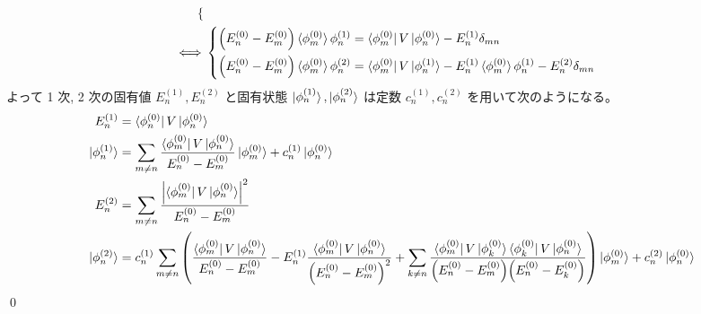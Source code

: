 \documentclass[uplatex,dvipdfmx,a4paper,11pt]{jlreq}
\makeatletter
\theoremstyle{definition}
\renewenvironment{proof}[1][\proofname]{\par
  \normalfont
  \topsep6\p@\@plus6\p@ \trivlist
  \item[\hskip\labelsep{\bfseries #1}\@addpunct{\bfseries}]\ignorespaces\quad\par
}{%
  \qed\endtrivlist\@endpefalse
}
\renewcommand\proofname{証明}
\makeatother
\begin{document}
\begin{proof}
\begin{align}
\begin{dcases}
           \end{dcases}          \\
    \iff & \begin{dcases}
             \qty(E_n^{(0)} - E_m^{(0)})\braket{\phi_m^{(0)}}{\phi_n^{(1)}} = \bra{\phi_m^{(0)}}V\ket{\phi_n^{(0)}} - E_n^{(1)}\delta_{mn} \\
             \qty(E_n^{(0)} - E_m^{(0)})\braket{\phi_m^{(0)}}{\phi_n^{(2)}} = \bra{\phi_m^{(0)}}V\ket{\phi_n^{(1)}} - E_n^{(1)}\braket{\phi_m^{(0)}}{\phi_n^{(1)}} - E_n^{(2)}\delta_{mn}
           \end{dcases}
  \end{align}
  よって 1 次, 2 次の固有値 $E_n^{(1)}, E_n^{(2)}$ と固有状態 $\ket{\phi_n^{(1)}}, \ket{\phi_n^{(2)}}$ は定数 $c_n^{(1)}, c_n^{(2)}$ を用いて次のようになる。
  \begin{align}
    E_n^{(1)}          & = \bra{\phi_n^{(0)}}V\ket{\phi_n^{(0)}}                                                                                                                                                                                                                                                                                                                                                             \\
    \ket{\phi_n^{(1)}} & = \sum_{m\neq n}\frac{\bra{\phi_m^{(0)}}V\ket{\phi_n^{(0)}}}{E_n^{(0)} - E_m^{(0)}}\ket{\phi_m^{(0)}} + c_n^{(1)}\ket{\phi_n^{(0)}}                                                                                                                                                                                                                                                                 \\
    E_n^{(2)}          & = \sum_{m\neq n}\frac{\qty|\bra{\phi_m^{(0)}}V\ket{\phi_n^{(0)}}|^2}{E_n^{(0)} - E_m^{(0)}}                                                                                                                                                                                                                                                                                                         \\
    \ket{\phi_n^{(2)}} & = c_n^{(1)}\sum_{m\neq n}\qty(\frac{\bra{\phi_m^{(0)}}V\ket{\phi_n^{(0)}}}{E_n^{(0)} - E_m^{(0)}} - E_n^{(1)}\frac{\bra{\phi_m^{(0)}}V\ket{\phi_n^{(0)}}}{\qty(E_n^{(0)} - E_m^{(0)})^2} + \sum_{k\neq n}\frac{\bra{\phi_m^{(0)}}V\ket{\phi_k^{(0)}}\bra{\phi_k^{(0)}}V\ket{\phi_n^{(0)}}}{\qty(E_n^{(0)} - E_m^{(0)})\qty(E_n^{(0)} - E_k^{(0)})})\ket{\phi_m^{(0)}} + c_n^{(2)}\ket{\phi_n^{(0)}}
  \end{align}
\end{proof}
\end{document}
